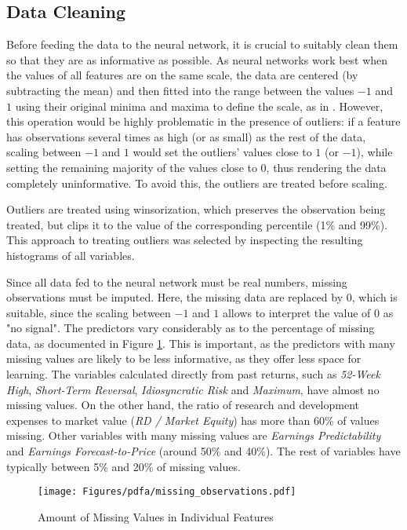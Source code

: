 	\subsection{Data Cleaning}
	
		Before feeding the data to the neural network, it is crucial to suitably clean them so that they are as informative as possible. As neural networks work best when the values of all features are on the same scale, the data are centered (by subtracting the mean) and then fitted into the range between the values $-1$ and $1$ using their original minima and maxima to define the scale, as in \cite{gu2020empirical}. However, this operation would be highly problematic in the presence of outliers: if a feature has observations several times as high (or as small) as the rest of the data, scaling between $-1$ and $1$ would set the outliers' values close to $1$ (or $-1$), while setting the remaining majority of the values close to 0, thus rendering the data completely uninformative. To avoid this, the outliers are treated before scaling.
		
		Outliers are treated using winsorization, which preserves the observation being treated, but clips it to the value of the corresponding percentile (1\% and 99\%). This approach to treating outliers was selected by inspecting the resulting histograms of all variables.     
		
		Since all data fed to the neural network must be real numbers, missing observations must be imputed. Here, the missing data are replaced by 0, which is suitable, since the scaling between $-1$ and $1$ allows to interpret the value of $0$ as "no signal". The predictors vary considerably as to the percentage of missing data, as documented in Figure \ref{fig:missing_observations}. This is important, as the predictors with many missing values are likely to be less informative, as they offer less space for learning. The variables calculated directly from past returns, such as \textit{52-Week High}, \textit{Short-Term Reversal}, \textit{Idiosyncratic Risk} and \textit{Maximum}, have almost no missing values. On the other hand, the ratio of research and development expenses to market value (\textit{RD / Market Equity}) has more than 60\% of values missing. Other variables with many missing values are \textit{Earnings Predictability} and \textit{Earnings Forecast-to-Price} (around 50\% and 40\%). The rest of variables have typically between 5\% and 20\% of missing values.
		\begin{center}
			\begin{figure}[!htb]
				\texttt{[image: Figures/pdfa/missing\_observations.pdf]}
				\caption{Amount of Missing Values in Individual Features}
				\label{fig:missing_observations}
			\end{figure}
		\end{center} 		  
	
